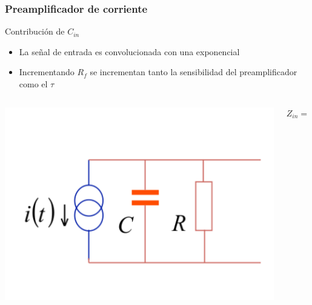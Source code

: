 \documentclass{beamer}
\begin{document}
\begin{frame}
\frametitle{Preamplificador de corriente}
\begin{block}{Contribución de $C_{in}$}
\begin{itemize}
\item La señal de entrada es convolucionada con una exponencial
\item Incrementando $R_f$ se incrementan tanto la sensibilidad del
preamplificador como el $\tau$
\end{itemize}
\end{block}
\begin{columns}
\begin{column}{0.5\textwidth}
\includegraphics[width=\textwidth]{d2/current_preamplifier_cin_contribution}
\end{column}
\begin{column}{0.5\textwidth}\centering
$Z_{in} = \frac{R}{1 + j\omega R C}$
\end{column}
\end{columns}
\end{frame}
\end{document}
